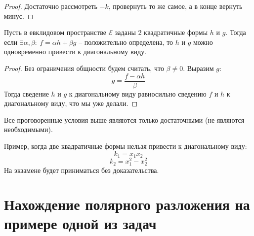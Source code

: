 \documentclass[11pt]{article}
\begin{document}
\begin{proof}
  Достаточно рассмотреть $-k$, провернуть то же самое, а в конце вернуть 
  минус.
\end{proof}

\begin{theorem}
  Пусть в евклидовом пространстве $\mathcal{E}$ заданы 2 квадратичные формы 
  $h$ и $g$. Тогда если $\exists \alpha, \beta: \ f = \alpha h + \beta g$ -- 
  положительно определена, то $h$ и $g$ можно одновременно привести к 
  диагональному виду.
\end{theorem}

\begin{proof}
  Без ограничения общности будем считать, что $\beta \neq 0$. Выразим $g$:
  \[g = \frac{f - \alpha h}{\beta}\]
  Тогда сведение $h$ и $g$ к диагональному виду равносильно сведению $f$ и 
  $h$ к диагональному виду, что мы уже делали.
\end{proof}

\begin{remark}
  Все проговоренные условия выше являются только достаточными (не являются 
  необходимыми). 
\end{remark}

\begin{example}
  Пример, когда две квадратичные формы нельзя привести к диагональному виду:
  \[k_1 = x_1x_2\]
  \[k_2 = x_1^2 - x_2^2\]
  На экзамене будет приниматься без доказательства.
\end{example}

\section{Нахождение полярного разложения на примере одной из задач}
\end{document}
